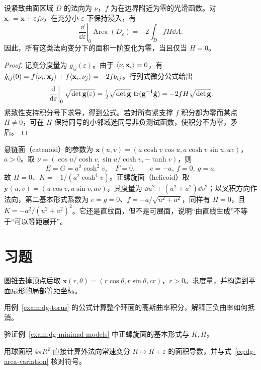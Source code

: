\begin{proposition}[法向变分的面积第一变分]
设紧致曲面区域 $D$ 的法向为 $\nu$，$f$ 为在边界附近为零的光滑函数。对 $\mathbf x_\varepsilon=\mathbf x+\varepsilon f\nu$，在充分小 $\varepsilon$ 下保持浸入，有
\begin{equation}
 \left.\frac{\dd}{\dd\varepsilon}\right|_{0}\operatorname{Area}(D_\varepsilon)
 =-2\int_D fH\dd A.
 \label{eq:dg-area-variation}
\end{equation}
因此，所有这类法向变分下的面积一阶变化为零，当且仅当 $H=0$。
\end{proposition}
\begin{proof}
记变分度量为 $g_{ij}(\varepsilon)$。由于 $\langle \nu,\mathbf x_i\rangle=0$，有 $\dot g_{ij}(0)=f\langle \nu_i,\mathbf x_j\rangle+f\langle \mathbf x_i,\nu_j\rangle=-2fb_{ij}$。行列式微分公式给出
\[
 \left.\frac{\mathop{}\!\mathrm d}{\mathop{}\!\mathrm d\varepsilon}\right|_0\sqrt{\det\mathbf g(\varepsilon)}
 =\tfrac12\sqrt{\det\mathbf g}\,\operatorname{tr}(\mathbf g^{-1}\dot{\mathbf g})
 =-2fH\sqrt{\det\mathbf g}.
\]
紧致性支持积分号下求导，得到公式。若对所有紧支撑 $f$ 积分都为零而某点 $H\ne0$，可在 $H$ 保持同号的小邻域选同号非负测试函数，使积分不为零，矛盾。
\end{proof}

\begin{example}[悬链面与正螺旋面]\label{exam:dg-minimal-models}
悬链面（catenoid）的参数为 $\mathbf x(u,v)=(a\cosh v\cos u,a\cosh v\sin u,av)$，$a>0$。取 $\nu=(\cos u/\cosh v,\sin u/\cosh v,-\tanh v)$，则
\[
 E=G=a^2\cosh^2v,\quad F=0,\qquad e=-a,\ f=0,\ g=a.
\]
故 $H=0$、$K=-1/(a^2\cosh^4v)$。正螺旋面（helicoid）取 $\mathbf y(u,v)=(u\cos v,u\sin v,av)$，其度量为 $\dd u^2+(u^2+a^2)\dd v^2$；以叉积方向作法向，第二基本形式系数为 $e=g=0$、$f=-a/\sqrt{u^2+a^2}$，同样有 $H=0$，且 $K=-a^2/(u^2+a^2)^2$。它还是直纹面，但不是可展面，说明“由直线生成”不等于“可以等距展开”。
\end{example}

\section{习题}
\begin{exercise}\label{ex:dg-examples-cone}
圆锥去掉顶点后取 $\mathbf x(r,\theta)=(r\cos\theta,r\sin\theta,cr)$，$r>0$。求度量，并构造到平面扇形的局部等距坐标。
\end{exercise}
\begin{exercise}\label{ex:dg-examples-torus}
用例~\ref{exam:dg-torus} 的公式计算整个环面的高斯曲率积分，解释正负曲率如何抵消。
\end{exercise}
\begin{exercise}\label{ex:dg-examples-helicoid}
验证例~\ref{exam:dg-minimal-models} 中正螺旋面的基本形式与 $K,H$。
\end{exercise}
\begin{exercise}\label{ex:dg-examples-sphere-variation}
用球面积 $4\pi R^2$ 直接计算外法向常速变分 $R\mapsto R+\varepsilon$ 的面积导数，并与式~\eqref{eq:dg-area-variation} 核对符号。
\end{exercise}

